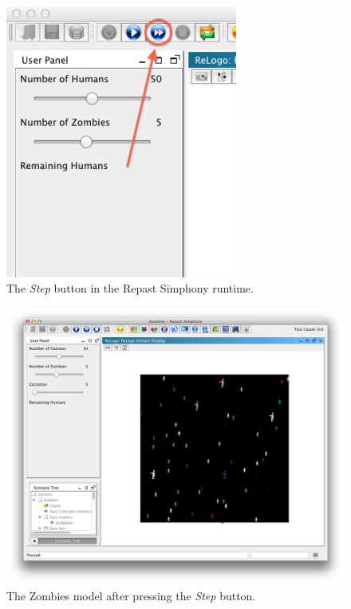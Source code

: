 \documentclass[11pt]{amsart}
\begin{document}
\begin{figure}
\begin{center}
\vspace{.2in}
\centerline {
\includegraphics[width=3in]{GettingStartedImages/StepRuntime.png}
}
\caption{The \emph{Step} button in the Repast Simphony runtime.}
\label{fig:stepRuntime}
\end{center}
\end{figure}

\begin{figure}
\begin{center}
\vspace{.2in}
\centerline {
\includegraphics[width=5in]{GettingStartedImages/StepZombies.png}
}
\caption{The Zombies model after pressing the \emph{Step} button.}
\label{fig:stepzombies}
\end{center}
\end{figure}
\end{document}
